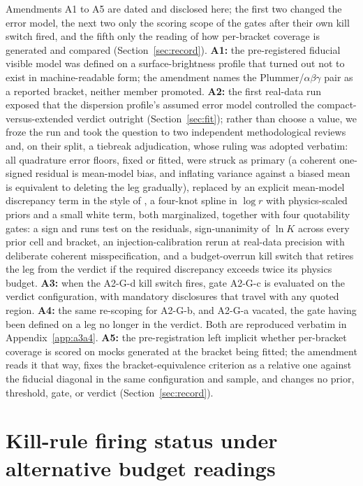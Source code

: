 \documentclass[11pt]{article}
\newcommand{\lnK}{\ensuremath{\ln K}}
\begin{document}
Amendments A1 to A5 are dated and disclosed here; the first two changed the error model, the next two only the scoring scope of the gates after their own kill switch fired, and the fifth only the reading of how per-bracket coverage is generated and compared (Section~\ref{sec:record}). \textbf{A1:} the pre-registered fiducial visible model was defined on a surface-brightness profile that turned out not to exist in machine-readable form; the amendment names the Plummer/$\alpha\beta\gamma$ pair as a reported bracket, neither member promoted. \textbf{A2:} the first real-data run exposed that the dispersion profile's assumed error model controlled the compact-versus-extended verdict outright (Section~\ref{sec:fit}); rather than choose a value, we froze the run and took the question to two independent methodological reviews and, on their split, a tiebreak adjudication, whose ruling was adopted verbatim: all quadrature error floors, fixed or fitted, were struck as primary (a coherent one-signed residual is mean-model bias, and inflating variance against a biased mean is equivalent to deleting the leg gradually), replaced by an explicit mean-model discrepancy term in the style of \citet{KennedyOHagan2001}, a four-knot spline in $\log r$ with physics-scaled priors and a small white term, both marginalized, together with four quotability gates: a sign and runs test on the residuals, sign-unanimity of \lnK{} across every prior cell and bracket, an injection-calibration rerun at real-data precision with deliberate coherent misspecification, and a budget-overrun kill switch that retires the leg from the verdict if the required discrepancy exceeds twice its physics budget. \textbf{A3:} when the A2-G-d kill switch fires, gate A2-G-c is evaluated on the verdict configuration, with mandatory disclosures that travel with any quoted region. \textbf{A4:} the same re-scoping for A2-G-b, and A2-G-a vacated, the gate having been defined on a leg no longer in the verdict. Both are reproduced verbatim in Appendix~\ref{app:a3a4}. \textbf{A5:} the pre-registration left implicit whether per-bracket coverage is scored on mocks generated at the bracket being fitted; the amendment reads it that way, fixes the bracket-equivalence criterion as a relative one against the fiducial diagonal in the same configuration and sample, and changes no prior, threshold, gate, or verdict (Section~\ref{sec:record}).

\section{Kill-rule firing status under alternative budget readings}
\label{app:fire}
\end{document}
